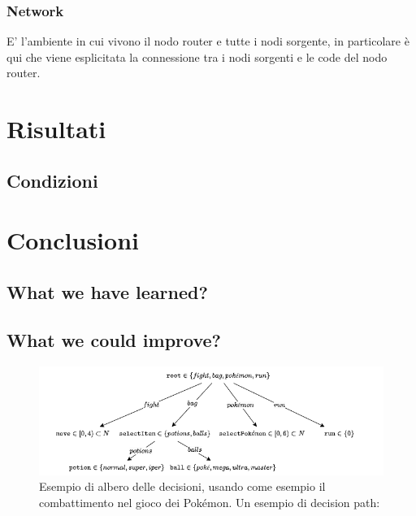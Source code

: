\documentclass[conference]{IEEEtran}
\begin{document}
\subsubsection{Network}
E' l'ambiente in cui vivono il nodo router e tutte i nodi sorgente, in particolare è qui che viene esplicitata la connessione tra i nodi sorgenti e le code del nodo router. 

\section{Risultati}

\subsection{Condizioni}


\section{Conclusioni}

\subsection{What we have learned?}

\subsection{What we could improve?}

\begin{figure}
    \centering
    \includegraphics[width=\textwidth]{figs/decisions.drawio.png}
    \caption{Esempio di albero delle decisioni, usando come esempio il combattimento
    nel gioco dei Pokémon. Un esempio di decision path:\\ }
    \label{fig:decisions}
\end{figure}
\end{document}
